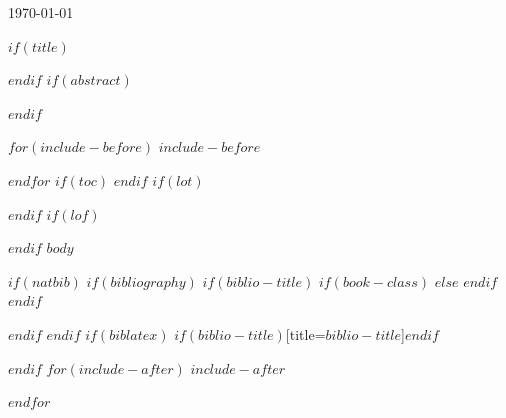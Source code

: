 \documentclass[$if(fontsize)$$fontsize$,$endif$$if(lang)$$lang$,$endif$$if(papersize)$$papersize$,$endif$$for(classoption)$$classoption$$sep$,$endfor$]{$documentclass$}
\begin{document}
\begin{titlepage}

{\large \today}\\[2cm] %

\vfill %

\end{titlepage}

$if(title)$
\maketitle
$endif$
$if(abstract)$
\begin{abstract}
$abstract$
\end{abstract}
$endif$

$for(include-before)$
$include-before$

$endfor$
$if(toc)$
{
\hypersetup{linkcolor=$if(toccolor)$$toccolor$$else$black$endif$}
\setcounter{tocdepth}{$toc-depth$}
\tableofcontents
\clearpage
}
$endif$
$if(lot)$
\listoftables
$endif$
$if(lof)$
\listoffigures
$endif$
$body$

$if(natbib)$
$if(bibliography)$
$if(biblio-title)$
$if(book-class)$
\renewcommand\bibname{$biblio-title$}
$else$
\renewcommand\refname{$biblio-title$}
$endif$
$endif$


$endif$
$endif$
$if(biblatex)$
\printbibliography$if(biblio-title)$[title=$biblio-title$]$endif$

$endif$
$for(include-after)$
$include-after$

$endfor$
\end{document}
